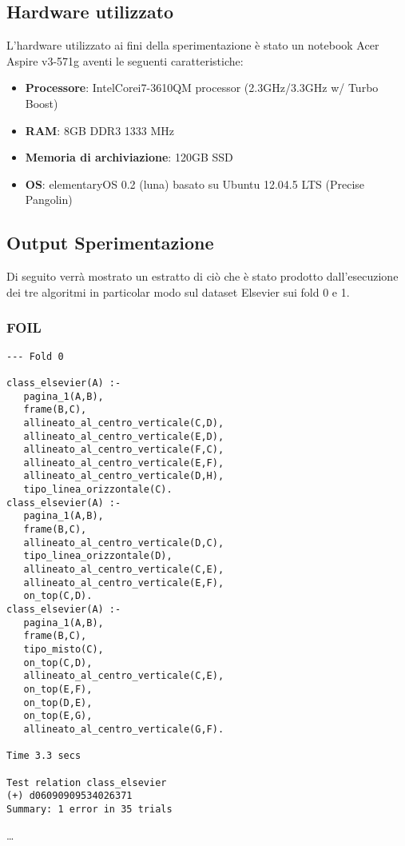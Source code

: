 \subsection{Hardware utilizzato}
\label{hw}
L'hardware utilizzato ai fini della sperimentazione è stato un notebook Acer Aspire v3-571g aventi le seguenti caratteristiche:
\begin{itemize}
	\item \textbf{Processore}: Intel\textregistered Core\texttrademark  i7-3610QM processor (2.3GHz/3.3GHz w/ Turbo Boost)
	\item \textbf{RAM}: 8GB DDR3 1333 MHz
	\item \textbf{Memoria di archiviazione}: 120GB SSD
	\item \textbf{OS}: elementaryOS 0.2 (luna) basato su Ubuntu 12.04.5 LTS (Precise Pangolin)
\end{itemize}

\subsection{Output Sperimentazione}
Di seguito verrà mostrato un estratto di ciò che è stato prodotto dall'esecuzione dei tre algoritmi in particolar modo sul dataset Elsevier sui fold 0 e 1.
\subsubsection{FOIL}
\begin{verbatim}
--- Fold 0

class_elsevier(A) :- 
   pagina_1(A,B), 
   frame(B,C), 
   allineato_al_centro_verticale(C,D),
   allineato_al_centro_verticale(E,D), 
   allineato_al_centro_verticale(F,C), 
   allineato_al_centro_verticale(E,F), 
   allineato_al_centro_verticale(D,H), 
   tipo_linea_orizzontale(C).
class_elsevier(A) :- 
   pagina_1(A,B), 
   frame(B,C), 
   allineato_al_centro_verticale(D,C), 
   tipo_linea_orizzontale(D), 
   allineato_al_centro_verticale(C,E), 
   allineato_al_centro_verticale(E,F), 
   on_top(C,D).
class_elsevier(A) :- 
   pagina_1(A,B), 
   frame(B,C), 
   tipo_misto(C), 
   on_top(C,D), 
   allineato_al_centro_verticale(C,E), 
   on_top(E,F), 
   on_top(D,E), 
   on_top(E,G), 
   allineato_al_centro_verticale(G,F).

Time 3.3 secs

Test relation class_elsevier
(+)	d06090909534026371
Summary: 1 error in 35 trials
\end{verbatim}
\dots
